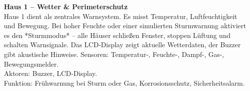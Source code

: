 
\textbf{Haus 1 – Wetter \& Perimeterschutz}\\
Haus 1 dient als zentrales Warnsystem. Es misst Temperatur, Luftfeuchtigkeit und Bewegung.
Bei hoher Feuchte oder einer simulierten Sturmwarnung aktiviert es den *Sturmmodus* – alle Häuser schließen Fenster, stoppen Lüftung und schalten Warnsignale.
Das LCD-Display zeigt aktuelle Wetterdaten, der Buzzer gibt akustische Hinweise.
Sensoren: Temperatur-, Feuchte-, Dampf-, Gas-, Bewegungsmelder.\\
Aktoren: Buzzer, LCD-Display.\\
Funktion: Frühwarnung bei Sturm oder Gas, Korrosionsschutz, Sicherheitsalarm.
